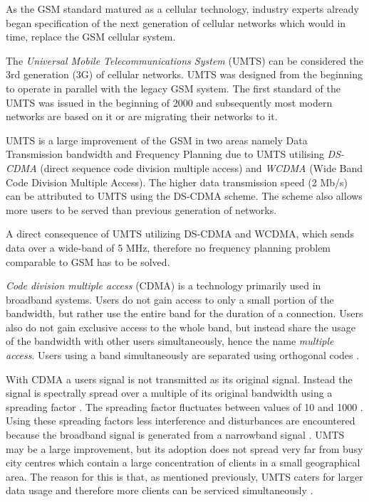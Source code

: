 As the GSM standard matured as a cellular technology, industry experts already began specification of the next generation of cellular networks which would in time, replace the GSM cellular system. 

The \emph{Universal Mobile Telecommunications System} (UMTS) can be considered the 3rd generation (3G) of cellular networks. UMTS was designed from the beginning to operate in parallel with the legacy GSM system. The first standard of the UMTS was issued in the beginning of 2000 and subsequently most modern networks are based on it or are migrating their networks to it.

UMTS is a large improvement of the GSM in two areas namely Data Transmission bandwidth and Frequency Planning due to UMTS utilising \emph{DS-CDMA} (direct sequence code division multiple access) and \emph{WCDMA} (Wide Band Code Division Multiple Access). The higher data transmission speed (2 Mb/s) can be attributed to UMTS using the DS-CDMA scheme. The scheme also allows more users to be served than previous generation of networks\cite{tabuglobalplanning3g,Eisenblatter}. 

A direct consequence of UMTS utilizing DS-CDMA and WCDMA, which sends data over a wide-band of 5 MHz, therefore no frequency planning problem comparable to GSM has to be solved\cite{tabuglobalplanning3g,Eisenblatter}. 

\emph{Code division multiple access} (CDMA) is a technology primarily used in broadband systems. Users do not gain access to only a small portion of the bandwidth, but rather use the entire band for the duration of a connection. Users also do not gain exclusive access to the whole band, but instead share the usage of the bandwidth with other users simultaneously, hence the name \emph{multiple access}. Users using a band simultaneously are separated using orthogonal codes \cite{GSMArchitectureProtocolsServices}.

With CDMA a users signal is not transmitted as its original signal. Instead the signal is spectrally spread over a multiple of its original bandwidth using a spreading factor \cite{GSMArchitectureProtocolsServices}. The spreading factor fluctuates between values of 10 and 1000 \cite{GSMArchitectureProtocolsServices}. Using these spreading factors less interference and disturbances are encountered because the broadband signal is generated from a narrowband signal \cite{GSMArchitectureProtocolsServices}.
UMTS may be a large improvement, but its adoption does not spread very far from busy city centres which contain a large concentration of clients in a small geographical area. The reason for this is that, as mentioned previously, UMTS caters for larger data usage and therefore more clients can be serviced simultaneously \cite{GSMArchitectureProtocolsServices}.

